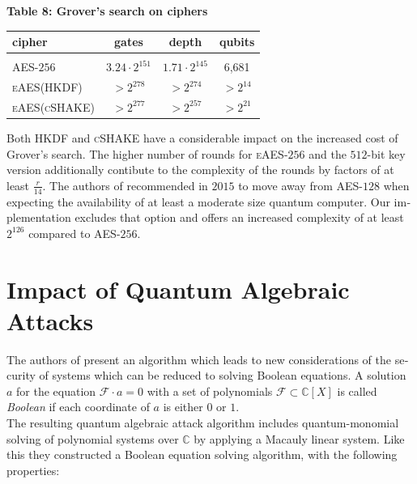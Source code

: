 \documentclass[a4paper,11pt]{article}
\begin{document}
\begin{otherlanguage}{english}
\begin{center}
\textbf{Table 8: Grover's search on ciphers} \\
\vspace{0.2cm}
  \begin{tabular}{l|c|c|c}
  cipher &  gates & depth & qubits \\ 
  \hline
    &  &  & \\ [-8pt]
  \textsc{AES}-$256$ & $3.24 \cdot 2^{151}$  & $1.71 \cdot 2^{145}$  & 6,681 \\
  \small{\textsc{eAES}(\tiny{\textsc{HKDF}})} & $> 2^{278}$ & $ > 2^{274}$ & $>  2^{14}$  \\  
  \small{\textsc{eAES}(\tiny{\textsc{cSHAKE}})} & $> 2^{277}$ & $ > 2^{257}$ & $> 2^{21}$  \\  
  \end{tabular} 
\end{center}
\vspace{0.5cm} 

\noindent
Both \textsc{HKDF} and \textsc{cSHAKE} have a considerable impact on the increased cost of Grover's search. The higher number of rounds for \textsc{eAES}-$256$ and the $512$-bit key version additionally contibute to the complexity of the rounds by factors of at least $\frac{r}{14}$. The authors of \cite{GRO} recommended in $2015$ to move away from \textsc{AES}-$128$ when expecting the availability of at least a moderate size quantum computer. Our implementation excludes that option and offers an increased complexity of at least $2^{126}$ compared to \textsc{AES}-$256$. \\

\section{Impact of Quantum Algebraic Attacks}

\noindent
The authors of \cite{QAA} present an algorithm which leads to new considerations of the security of systems which can be reduced to solving Boolean equations. A solution $a$ for the equation $\mathcal{F} \cdot a = 0$ with a set of polynomials $\mathcal{F} \subset \mathbb{C}[X]$ is called \textit{Boolean} if each coordinate of $a$ is either $0$ or $1$.\\

\noindent
The resulting quantum algebraic attack algorithm includes quantum-monomial solving of polynomial systems over $\mathbb{C}$ by applying a Macauly linear system. Like this they constructed a Boolean equation solving algorithm, with the following properties: \\


\end{otherlanguage}
\end{document}
